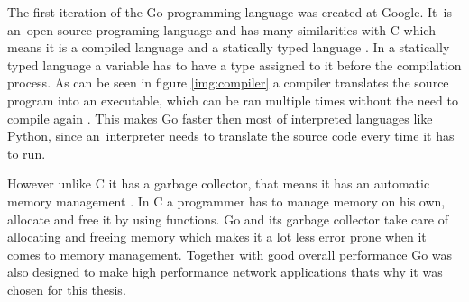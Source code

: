 The first iteration of the Go programming language was created at Google. It~is an~open-source programing language and has many similarities with C which means it is a compiled language and a statically typed language \cite{Donovan2016}. In a statically typed language a variable has to have a type assigned to it before the compilation process. As can be seen in figure \ref{img:compiler} a compiler translates the source program into an executable, which can be ran multiple times without the need to compile again \cite{Aho2006}. This makes Go faster then most of interpreted languages like Python, since an~interpreter needs to translate the source code every time it has to run.


However unlike C it has a garbage collector, that means it has an automatic memory management \cite{Donovan2016}. In C a programmer has to manage memory on his own, allocate and free it by using functions. Go and its garbage collector take care of allocating and freeing memory which makes it a lot less error prone when it comes to memory management. Together with good overall performance Go was also designed to make high performance network applications thats why it was chosen for this thesis.